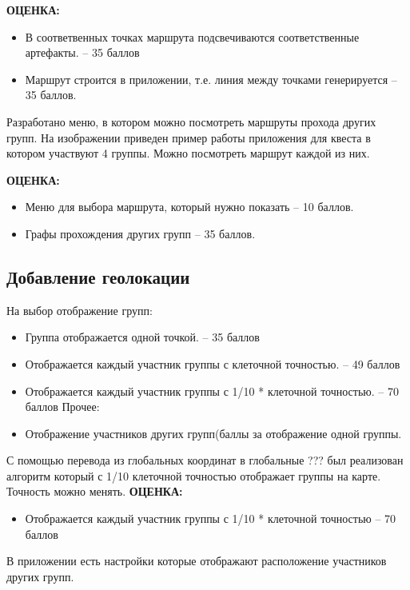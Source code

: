 
\textbf{ОЦЕНКА:}
\begin{itemize}
    \item	В соответвенных точках маршрута подсвечиваются соответственные 
артефакты. – 35 баллов
    \item	Маршрут строится в приложении, т.е. линия между точками 
генерируется – 35 баллов.
\end{itemize}

Разработано меню, в котором можно посмотреть маршруты прохода других групп. На изображении приведен пример работы приложения для квеста в котором участвуют 4 группы. Можно посмотреть маршрут каждой из них.


\textbf{ОЦЕНКА:}
\begin{itemize}
    \item	Меню для выбора маршрута, который нужно показать – 10 баллов.
    \item	Графы прохождения других групп – 35 баллов.
\end{itemize}

\subsection*{Добавление геолокации}

\markSection
На выбор отображение групп:
    \begin{itemize}
        \item	Группа отображается одной точкой.  – 35 баллов
        \item	Отображается каждый участник группы с клеточной точностью. – 49 баллов
        \item	Отображается каждый участник группы с 1/10 * клеточной точностью. – 70 баллов
    Прочее:
        \item	Отображение участников других групп(баллы за отображение одной группы.
    \end{itemize}
\solutionSection
С помощью перевода из глобальных координат в глобальные ??? был реализован алгоритм который с 1/10 клеточной точностью отображает группы на карте. Точность можно менять. 
\textbf{ОЦЕНКА:}
\begin{itemize}
    \item Отображается каждый участник группы с 1/10 * клеточной точностью – 70 баллов
\end{itemize}
В приложении есть настройки которые отображают расположение участников других групп.

